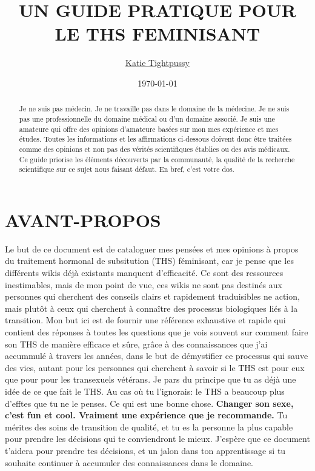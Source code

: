 \documentclass{article}
\title{UN GUIDE PRATIQUE POUR LE THS FEMINISANT}
\author{\href{https://katea.gay/}{Katie Tightpussy}}
\date{\today}
\begin{document}


\maketitle
\tableofcontents
\begin{abstract}
  Je ne suis pas médecin. Je ne travaille pas dans le domaine de la médecine. Je ne suis pas une professionnelle du domaine médical ou d'un domaine associé. Je suis une amateure qui offre des opinions d'amateure basées sur mon mes expérience et mes études. Toutes les informations et les affirmations ci-dessous doivent donc être traitées comme des opinions et non pas des vérités scientifiques établies ou des avis médicaux. Ce guide priorise les éléments découverts par la communauté, la qualité de la recherche scientifique sur ce sujet nous faisant défaut. En bref, c'est votre dos.
\end{abstract}


\section{AVANT-PROPOS}

Le but de ce document est de cataloguer mes pensées et mes opinions à propos du traitement hormonal de subsitution (THS) féminisant, car je pense que les différents wikis déjà existants manquent d'efficacité. Ce sont des ressources inestimables, mais de mon point de vue, ces wikis ne sont pas destinés aux personnes qui cherchent des conseils clairs et rapidement traduisibles ne action, mais plutôt à ceux qui cherchent à connaître des processus biologiques liés à la transition. Mon but ici est de fournir une référence exhaustive et rapide qui contient des réponses à toutes les questions que je vois souvent sur comment faire son THS de manière efficace et sûre, grâce à des connaissances que j'ai accummulé à travers les années, dans le but de démystifier ce processus qui sauve des vies, autant pour les personnes qui cherchent à savoir si le THS est pour eux que pour pour les transexuels vétérans. Je pars du principe que tu as déjà une idée de ce que fait le THS. Au cas où tu l'ignorais: le THS a beaucoup plus d'efftes que tu ne le penses. Ce qui est une bonne chose. \textbf{Changer son sexe, c'est fun et cool. Vraiment une expérience que je recommande.} Tu mérites des soins de transition de qualité, et tu es la personne la plus capable pour prendre les décisions qui te conviendront le mieux. J'espère que ce document t'aidera pour prendre tes décisions, et un jalon dans ton apprentissage si tu souhaite continuer à accumuler des connaissances dans le domaine.
\end{document}
